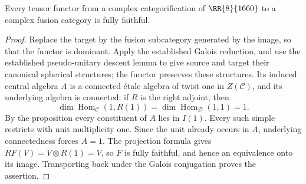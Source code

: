 \begin{corollary}\label{cor:1660-twist-one-quotient}
Every tensor functor from a complex categorification of
$\RR{8}{1660}$ to a complex fusion category is fully faithful.
\end{corollary}
\begin{proof}
Replace the target by the fusion subcategory generated by the image,
so that the functor is dominant. Apply the established Galois reduction,
and use the established pseudo-unitary descent lemma to give source
and target their canonical spherical structures; the functor preserves
these structures. Its induced central algebra $A$ is a connected
\'etale algebra of twist one in $Z(\mathcal C)$, and its underlying
algebra is connected: if $R$ is the right adjoint, then
\[
 \dim\operatorname{Hom}_{\mathcal C}(1,R(1))
 =\dim\operatorname{Hom}_{\mathcal D}(1,1)=1.
\]
By the proposition every constituent of $A$ lies in $I(1)$.
Every such simple restricts with unit multiplicity one. Since the
unit already occurs in $A$, underlying connectedness forces $A=1$.
The projection formula gives $RF(V)=V\otimes R(1)=V$, so $F$ is
fully faithful, and hence an equivalence onto its image. Transporting
back under the Galois conjugation proves the assertion.
\end{proof}
